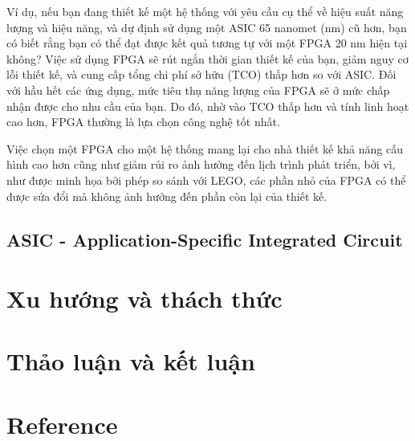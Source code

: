 \documentclass[a4paper]{article}
\begin{document}
Ví dụ, nếu bạn đang thiết kế một hệ thống với yêu cầu cụ thể về hiệu suất năng lượng và hiệu năng, và dự định sử dụng một ASIC 65 nanomet (nm) cũ hơn, bạn có biết rằng bạn có thể đạt được kết quả tương tự với một FPGA 20 nm hiện tại không? Việc sử dụng FPGA sẽ rút ngắn thời gian thiết kế của bạn, giảm nguy cơ lỗi thiết kế, và cung cấp tổng chi phí sở hữu (TCO) thấp hơn so với ASIC. Đối với hầu hết các ứng dụng, mức tiêu thụ năng lượng của FPGA sẽ ở mức chấp nhận được cho nhu cầu của bạn. Do đó, nhờ vào TCO thấp hơn và tính linh hoạt cao hơn, FPGA thường là lựa chọn công nghệ tốt nhất.

Việc chọn một FPGA cho một hệ thống mang lại cho nhà thiết kế khả năng cấu hình cao hơn cũng như giảm rủi ro ảnh hưởng đến lịch trình phát triển, bởi vì, như được minh họa bởi phép so sánh với LEGO, các phần nhỏ của FPGA có thể được sửa đổi mà không ảnh hưởng đến phần còn lại của thiết kế.
\subsection{ASIC - Application-Specific Integrated Circuit}
\section{Xu hướng và thách thức}
\section{Thảo luận và kết luận}
\section{Reference}
\end{document}
